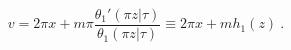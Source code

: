\begin{equation}
  \label{eq:v}
  v= 2 \pi x + 
m\pi\frac{\theta_1'(\pi z|\tau)}{\theta_1(\pi z|\tau)}
\equiv 2\pi x +mh_1(z)\  .
\end{equation}


